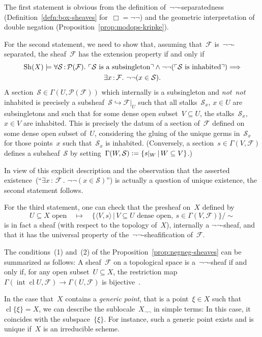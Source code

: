 \documentclass[10pt,reqno,a4paper]{amsbook}
\makeatletter
\theoremstyle{definition}
\theoremstyle{plain}
\theoremstyle{remark}
\newcommand{\F}{\mathcal{F}}
\renewcommand{\P}{\mathcal{P}}
\renewcommand{\S}{\mathcal{S}}
\newcommand{\Sh}{\mathrm{Sh}}
\DeclareMathOperator{\Int}{int}
\DeclareMathOperator{\Clos}{cl}
\newcommand{\?}{\,{:}\,}
\renewcommand{\_}{\mathpunct{.}\,}
\newcommand{\speak}[1]{\ulcorner\text{\textnormal{#1}}\urcorner}
\newcommand{\notnot}{\emph{not~not}\xspace}
\newcommand{\defeq}{\vcentcolon=}
\renewenvironment{proof}[1][\proofname]{\par
  \pushQED{\qed}%
  \normalfont \topsep6\p@\@plus6\p@\relax
  \trivlist
  \item[\hskip\labelsep
        \itshape
    #1\@addpunct{.}]\ignorespaces
}{%
  \popQED\endtrivlist\@endpefalse
}
\makeatother
\begin{document}
\begin{proof}
The first statement is obvious from the definition of~$\neg\neg$-separatedness
(Definition~\ref{defn:box-sheaves} for~$\Box = \neg\neg$) and the geometric
interpretation of double negation (Proposition~\ref{prop:modops-kripke}).

For the second statement, we need to show that, assuming that~$\F$
is~$\neg\neg$-separated, the sheaf~$\F$ has the extension property if and only if
\begin{multline*}
  \Sh(X) \models \forall \S \? \P(\F)\_
  \speak{$\S$ is a subsingleton} \wedge
  \neg\neg(\speak{$\S$ is inhabited}) \Longrightarrow \\
  \exists x\?\F\_ \neg\neg(x \in \S).
\end{multline*}
A section~$\S \in \Gamma(U,\P(\F))$ which internally is a
subsingleton and \notnot inhabited is precisely a subsheaf~$\S \hookrightarrow
\F|_U$ such that all stalks~$\S_x$, $x \in U$ are subsingletons and such that for
some dense open subset~$V \subseteq U$, the stalks~$\S_x$, $x \in V$ are
inhabited. This is precisely the datum of a section of~$\F$ defined on some
dense open subset of~$U$, considering the gluing of the unique germs in~$\S_x$ for
those points~$x$ such that~$\S_x$ is inhabited. (Conversely, a section~$s \in
\Gamma(V,\F)$ defines a subsheaf~$\S$ by setting~$\Gamma(W,\S) \defeq \{ s|_W \,|\,
W \subseteq V \}$.)

In view of this explicit description and the observation that the asserted
existence~(``$\exists x\?\F\_ \neg\neg(x \in \S)$'') is actually a question of
unique existence, the second statement follows.

For the third statement, one can check that the presheaf on~$X$ defined by
\[ \text{$U \subseteq X$ open} \quad\longmapsto\quad
  \{ \langle V,s \rangle \,|\, \text{$V \subseteq U$ dense open},\ s \in \Gamma(V,\F)
  \}/{\sim} \]
is in fact a sheaf (with respect to the topology of~$X$), internally a $\neg\neg$-sheaf,
and that it has the universal property of the~$\neg\neg$-sheafification
of~$\F$.
\end{proof}

The conditions~(1) and~(2) of the Proposition~\ref{prop:negneg-sheaves} can be
summarized as follows: A sheaf~$\F$ on a topological space is
a~$\neg\neg$-sheaf if and only if, for any open subset~$U \subseteq X$, the
restriction map~$\Gamma(\Int\Clos U, \F) \to \Gamma(U,\F)$ is
bijective~\cite[Lemma~36]{jackson:sheaf-theoretic-measure-theory}.

In the case that~$X$ contains a \emph{generic point}, that is a point~$\xi \in X$
such that~$\Clos\{\xi\} = X$, we can describe the sublocale~$X_{\neg\neg}$ in
simple terms: In this case, it coincides with the subspace~$\{\xi\}$.
For instance, such a generic point exists and is unique if~$X$ is an irreducible scheme.
\end{document}
